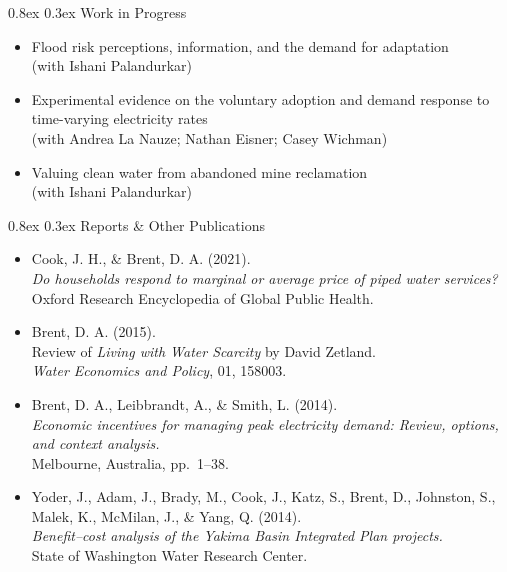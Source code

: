 \documentclass[
  11pt,
]{article}
\makeatletter
\renewcommand\subsection{
  \@startsection{subsection}{2}{0pt}
  {0.8ex}
  {0.3ex}
  {\sffamily\bfseries\large}
}
\makeatother
\begin{document}
\subsection{Work in Progress}\label{work-in-progress}

\begin{itemize}
\item
  Flood risk perceptions, information, and the demand for adaptation\\
  (with Ishani Palandurkar)
\item
  Experimental evidence on the voluntary adoption and demand response to
  time-varying electricity rates\\
  (with Andrea La Nauze; Nathan Eisner; Casey Wichman)
\item
  Valuing clean water from abandoned mine reclamation\\
  (with Ishani Palandurkar)
\end{itemize}

\subsection{Reports \& Other
Publications}\label{reports-other-publications}

\begin{itemize}
\item
  Cook, J. H., \& Brent, D. A. (2021).\\
  \emph{Do households respond to marginal or average price of piped
  water services?}\\
  Oxford Research Encyclopedia of Global Public Health.
\item
  Brent, D. A. (2015).\\
  Review of \emph{Living with Water Scarcity} by David Zetland.\\
  \emph{Water Economics and Policy}, 01, 158003.
\item
  Brent, D. A., Leibbrandt, A., \& Smith, L. (2014).\\
  \emph{Economic incentives for managing peak electricity demand:
  Review, options, and context analysis.}\\
  Melbourne, Australia, pp.~1--38.
\item
  Yoder, J., Adam, J., Brady, M., Cook, J., Katz, S., Brent, D.,
  Johnston, S., Malek, K., McMilan, J., \& Yang, Q. (2014).\\
  \emph{Benefit--cost analysis of the Yakima Basin Integrated Plan
  projects.}\\
  State of Washington Water Research Center.
\end{itemize}
\end{document}
